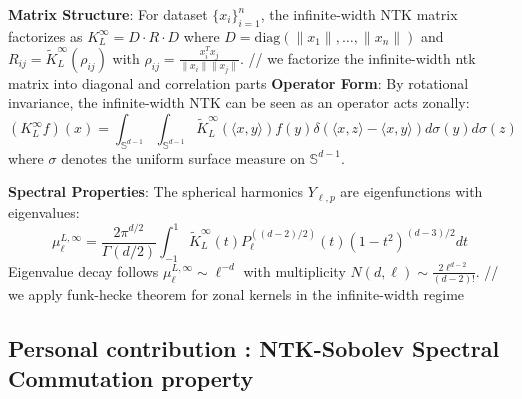 \documentclass[a4paper]{article}
\begin{document}
\textbf{Matrix Structure}: For dataset $\{x_i\}_{i=1}^n$, the infinite-width NTK matrix factorizes as $K_L^{\infty} = D \cdot R \cdot D$ where $D = \text{diag}(\|x_1\|, \ldots, \|x_n\|)$ and $R_{ij} = \tilde{K}_L^{\infty}(\rho_{ij})$ with $\rho_{ij} = \frac{x_i^T x_j}{\|x_i\| \|x_j\|}$. // we factorize the infinite-width ntk matrix into diagonal and correlation parts
\textbf{Operator Form}: By rotational invariance, the infinite-width NTK can be seen as an operator acts zonally:
$$(K_L^{\infty} f)(x) = \int_{\mathbb{S}^{d-1}} \int_{\mathbb{S}^{d-1}} \tilde{K}_L^{\infty}(\langle x, y \rangle) f(y) \delta(\langle x, z \rangle - \langle x, y \rangle) d\sigma(y) d\sigma(z)$$
where $\sigma$ denotes the uniform surface measure on $\mathbb{S}^{d-1}$.

\textbf{Spectral Properties}: The spherical harmonics $Y_{\ell,p}$ are eigenfunctions with eigenvalues:
$$\mu_\ell^{L,\infty} = \frac{2\pi^{d/2}}{\Gamma(d/2)} \int_{-1}^1 \tilde{K}_L^{\infty}(t)P_\ell^{((d-2)/2)}(t)(1-t^2)^{(d-3)/2}dt$$
Eigenvalue decay follows $\mu_\ell^{L,\infty} \sim \ell^{-d}$ with multiplicity $N(d,\ell) \sim \frac{2\ell^{d-2}}{(d-2)!}$. // we apply funk-hecke theorem for zonal kernels in the infinite-width regime











































\subsection{Personal contribution : NTK-Sobolev Spectral Commutation property}
\end{document}
